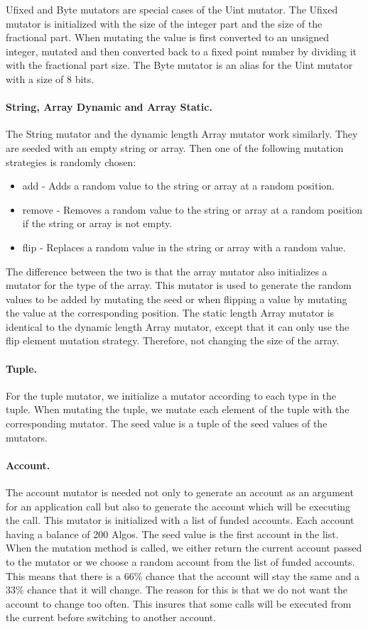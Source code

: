 Ufixed and Byte mutators are special cases of the Uint mutator. The Ufixed mutator is initialized with the size of the integer part and the size of the fractional part. When mutating the value is first converted to an unsigned integer, mutated and then converted back to a fixed point number by dividing it with the fractional part size. The Byte mutator is an alias for the Uint mutator with a size of 8 bits.

\paragraph{String, Array Dynamic and Array Static.}
The String mutator and the dynamic length Array mutator work similarly. They are seeded with an empty string or array. Then one of the following mutation strategies is randomly chosen:
\begin{itemize}
    \item add - Adds a random value to the string or array at a random position.
    \item remove - Removes a random value to the string or array at a random position if the string or array is not empty.
    \item flip - Replaces a random value in the string or array with a random value.
\end{itemize}

The difference between the two is that the array mutator also initializes a mutator for the type of the array.
This mutator is used to generate the random values to be added by mutating the seed or when flipping a value by mutating the value at the corresponding position.
The static length Array mutator is identical to the dynamic length Array mutator, except that it can only use the flip element mutation strategy.
Therefore, not changing the size of the array.

\paragraph{Tuple.}
For the tuple mutator, we initialize a mutator according to each type in the tuple.
When mutating the tuple, we mutate each element of the tuple with the corresponding mutator.
The seed value is a tuple of the seed values of the mutators.

\paragraph{Account.}
The account mutator is needed not only to generate an account as an argument for an application call but also to generate the account which will be executing the call.
This mutator is initialized with a list of funded accounts.
Each account having a balance of 200 Algos.
The seed value is the first account in the list.
When the mutation method is called, we either return the current account passed to the mutator or we choose a random account from the list of funded accounts.
This means that there is a 66\% chance that the account will stay the same and a 33\% chance that it will change.
The reason for this is that we do not want the account to change too often.
This insures that some calls will be executed from the current before switching to another account.


